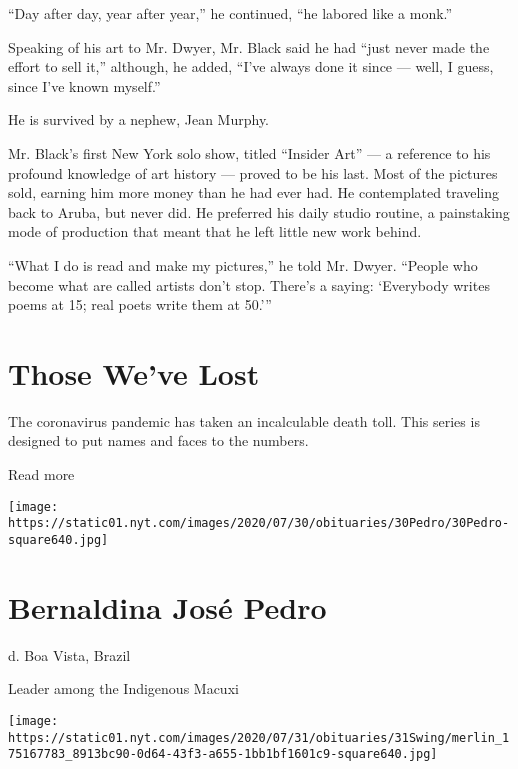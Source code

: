 ``Day after day, year after year,'' he continued, ``he labored like a
monk.''

Speaking of his art to Mr. Dwyer, Mr. Black said he had ``just never
made the effort to sell it,'' although, he added, ``I've always done it
since --- well, I guess, since I've known myself.''

He is survived by a nephew, Jean Murphy.

Mr. Black's first New York solo show, titled ``Insider Art'' --- a
reference to his profound knowledge of art history --- proved to be his
last. Most of the pictures sold, earning him more money than he had ever
had. He contemplated traveling back to Aruba, but never did. He
preferred his daily studio routine, a painstaking mode of production
that meant that he left little new work behind.

``What I do is read and make my pictures,'' he told Mr. Dwyer. ``People
who become what are called artists don't stop. There's a saying:
`Everybody writes poems at 15; real poets write them at 50.'''

\href{https://www.nytimes.com/interactive/2020/obituaries/people-died-coronavirus-obituaries.html?action=click\&pgtype=Article\&state=default\&region=BELOW_MAIN_CONTENT\&context=covid_obits_promo}{}

\hypertarget{those-weve-lost}{%
\section{Those We've Lost}\label{those-weve-lost}}

The coronavirus pandemic has taken an incalculable death toll. This
series is designed to put names and faces to the numbers.

Read more

\texttt{[image: https://static01.nyt.com/images/2020/07/30/obituaries/30Pedro/30Pedro-square640.jpg]}

\hypertarget{bernaldina-josuxe9-pedro}{%
\section{Bernaldina José Pedro}\label{bernaldina-josuxe9-pedro}}

d. Boa Vista, Brazil

Leader among the Indigenous Macuxi

\texttt{[image: https://static01.nyt.com/images/2020/07/31/obituaries/31Swing/merlin\_175167783\_8913bc90-0d64-43f3-a655-1bb1bf1601c9-square640.jpg]}

